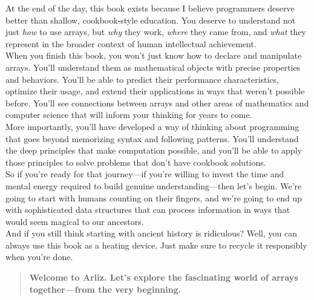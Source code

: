 At the end of the day, this book exists because I believe programmers deserve better than shallow, cookbook-style education. You deserve to understand not just \emph{how} to use arrays, but \emph{why} they work, \emph{where} they came from, and \emph{what} they represent in the broader context of human intellectual achievement.\\
When you finish this book, you won't just know how to declare and manipulate arrays. You'll understand them as mathematical objects with precise properties and behaviors. You'll be able to predict their performance characteristics, optimize their usage, and extend their applications in ways that weren't possible before. You'll see connections between arrays and other areas of mathematics and computer science that will inform your thinking for years to come.\\
More importantly, you'll have developed a way of thinking about programming that goes beyond memorizing syntax and following patterns. You'll understand the deep principles that make computation possible, and you'll be able to apply those principles to solve problems that don't have cookbook solutions.\\
So if you're ready for that journey—if you're willing to invest the time and mental energy required to build genuine understanding—then let's begin. We're going to start with humans counting on their fingers, and we're going to end up with sophisticated data structures that can process information in ways that would seem magical to our ancestors.\\
And if you still think starting with ancient history is ridiculous? Well, you can always use this book as a heating device. Just make sure to recycle it responsibly when you're done.\\
\begin{quote}
	\textbf{Welcome to Arliz. Let's explore the fascinating world of arrays together—from the very beginning.}
\end{quote}
